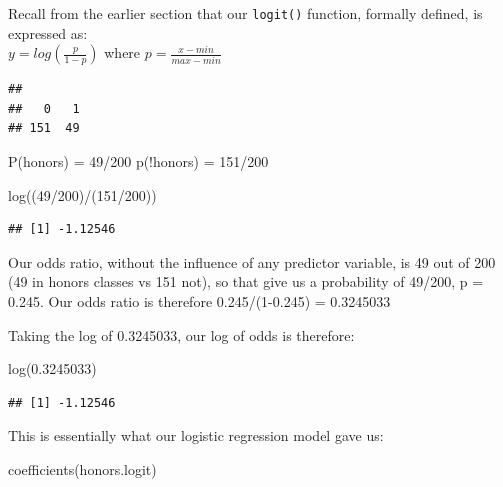 \documentclass[
]{article}
\newenvironment{Shaded}{\begin{snugshade}}{\end{snugshade}}
\newcommand{\DecValTok}[1]{\textcolor[rgb]{0.00,0.00,0.81}{#1}}
\newcommand{\FloatTok}[1]{\textcolor[rgb]{0.00,0.00,0.81}{#1}}
\newcommand{\FunctionTok}[1]{\textcolor[rgb]{0.00,0.00,0.00}{#1}}
\newcommand{\NormalTok}[1]{#1}
\newcommand{\SpecialCharTok}[1]{\textcolor[rgb]{0.00,0.00,0.00}{#1}}
\begin{document}
Recall from the earlier section that our \texttt{logit()} function,
formally defined, is expressed as:\\
\(y = log(\frac{p}{1-p})\) where \(p = \frac{x - min}{max-min}\)

\begin{Shaded}
\end{Shaded}

\begin{verbatim}
## 
##   0   1 
## 151  49
\end{verbatim}

P(honors) = 49/200 p(!honors) = 151/200

\begin{Shaded}
\begin{Highlighting}[]
\FunctionTok{log}\NormalTok{((}\DecValTok{49}\SpecialCharTok{/}\DecValTok{200}\NormalTok{)}\SpecialCharTok{/}\NormalTok{(}\DecValTok{151}\SpecialCharTok{/}\DecValTok{200}\NormalTok{))}
\end{Highlighting}
\end{Shaded}

\begin{verbatim}
## [1] -1.12546
\end{verbatim}

Our odds ratio, without the influence of any predictor variable, is 49
out of 200 (49 in honors classes vs 151 not), so that give us a
probability of 49/200, p = 0.245. Our odds ratio is therefore
0.245/(1-0.245) = 0.3245033

Taking the log of 0.3245033, our log of odds is therefore:

\begin{Shaded}
\begin{Highlighting}[]
\FunctionTok{log}\NormalTok{(}\FloatTok{0.3245033}\NormalTok{)}
\end{Highlighting}
\end{Shaded}

\begin{verbatim}
## [1] -1.12546
\end{verbatim}

This is essentially what our logistic regression model gave us:

\begin{Shaded}
\begin{Highlighting}[]
\FunctionTok{coefficients}\NormalTok{(honors.logit)}
\end{Highlighting}
\end{Shaded}
\end{document}
